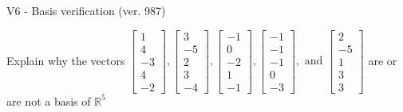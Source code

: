 \begin{exercise}
  \begin{exerciseTitle}V6 - Basis verification (ver. 987)\end{exerciseTitle}
  \begin{exerciseStatement}
    Explain why the vectors \(\left[\begin{array}{r}
1 \\
4 \\
-3 \\
4 \\
-2
\end{array}\right] , \left[\begin{array}{r}
3 \\
-5 \\
2 \\
3 \\
-4
\end{array}\right] , \left[\begin{array}{r}
-1 \\
0 \\
-2 \\
1 \\
-1
\end{array}\right] , \left[\begin{array}{r}
-1 \\
-1 \\
-1 \\
0 \\
-3
\end{array}\right] , \text{ and } \left[\begin{array}{r}
2 \\
-5 \\
1 \\
3 \\
3
\end{array}\right]\) are or are not a basis of \(\mathbb{R}^5\)	



\end{exerciseStatement}
\end{exercise}
